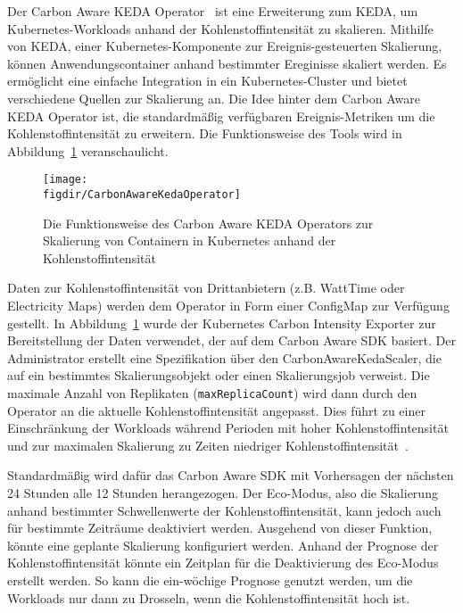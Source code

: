 Der Carbon Aware KEDA Operator~\cite{Azure.20240321T11:03:47.000Z} ist eine Erweiterung zum \ac{KEDA}, um Kubernetes-Workloads anhand der Kohlenstoffintensität zu skalieren.
Mithilfe von \ac{KEDA}, einer Kubernetes-Komponente zur Ereignis-gesteuerten Skalierung, können Anwendungscontainer anhand bestimmter Ereginisse skaliert werden.
Es ermöglicht eine einfache Integration in ein Kubernetes-Cluster und bietet verschiedene Quellen zur Skalierung an.
Die Idee hinter dem Carbon Aware \ac{KEDA} Operator ist, die standardmäßig verfügbaren Ereignis-Metriken um die Kohlenstoffintensität zu erweitern.
Die Funktionsweise des Tools wird in Abbildung~\ref{FIG:carbon-aware-keda-operator} veranschaulicht.
\begin{figure}
 \caption[Funktionsweise Carbon Aware KEDA Operator]{Die Funktionsweise des Carbon Aware KEDA Operators zur Skalierung von Containern in Kubernetes anhand der Kohlenstoffintensität~\cite{Azure.20240321T11:03:47.000Z}}
 {\texttt{[image: \\figdir/CarbonAwareKedaOperator]}}
 \label{FIG:carbon-aware-keda-operator}
\end{figure}
Daten zur Kohlenstoffintensität von Drittanbietern (z.B. WattTime oder Electricity Maps) werden dem Operator in Form einer ConfigMap zur Verfügung gestellt.
In Abbildung~\ref{FIG:carbon-aware-keda-operator} wurde der Kubernetes Carbon Intensity Exporter zur Bereitstellung der Daten verwendet, der auf dem Carbon Aware \ac{SDK} basiert.
Der Administrator erstellt eine Spezifikation über den CarbonAwareKedaScaler, die auf ein bestimmtes Skalierungsobjekt oder einen Skalierungsjob verweist.
Die maximale Anzahl von Replikaten (\lstinline[columns=fixed]{maxReplicaCount}) wird dann durch den Operator an die aktuelle Kohlenstoffintensität angepasst.
Dies führt zu einer Einschränkung der Workloads während Perioden mit hoher Kohlenstoffintensität und zur maximalen Skalierung zu Zeiten niedriger Kohlenstoffintensität~\cite{Azure.20240321T11:03:47.000Z}.

Standardmäßig wird dafür das Carbon Aware SDK mit Vorhersagen der nächsten 24 Stunden alle 12 Stunden herangezogen.
Der Eco-Modus, also die Skalierung anhand bestimmter Schwellenwerte der Kohlenstoffintensität, kann jedoch auch für bestimmte Zeiträume deaktiviert werden.
Ausgehend von dieser Funktion, könnte eine geplante Skalierung konfiguriert werden.
Anhand der Prognose der Kohlenstoffintensität könnte ein Zeitplan für die Deaktivierung des Eco-Modus erstellt werden.
So kann die ein-wöchige Prognose genutzt werden, um die Workloads nur dann zu Drosseln, wenn die Kohlenstoffintensität hoch ist.


